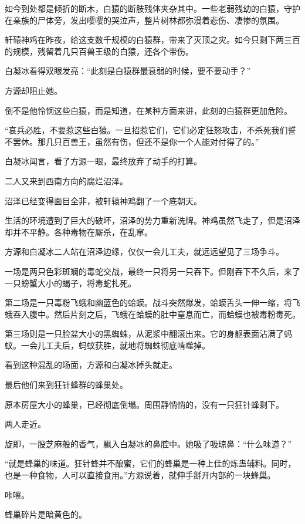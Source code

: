 \begin{this_body}
如今到处都是倾折的断木，白猿的断肢残体夹杂其中。一些老弱残幼的白猿，守护在亲族的尸体旁，发出嘤嘤的哭泣声，整片树林都弥漫着悲伤、凄惨的氛围。

轩辕神鸡在昨夜，给这支数千规模的白猿群，带来了灭顶之灾。如今只剩下两三百的规模，残留着几只百兽王级的白猿，还各个带伤。

白凝冰看得双眼发亮：“此刻是白猿群最衰弱的时候，要不要动手？”

方源却阻止她。

倒不是他怜悯这些白猿，而是知道，在某种方面来讲，此刻的白猿群更加危险。

“哀兵必胜，不要惹这些白猿。一旦招惹它们，它们必定狂怒攻击，不杀死我们誓不罢休。那几只百兽王，虽然有伤，但还不是你一个人能对付得了的。”

白凝冰闻言，看了方源一眼，最终放弃了动手的打算。

二人又来到西南方向的腐烂沼泽。

沼泽已经变得面目全非，被轩辕神鸡翻了一个底朝天。

生活的环境遭到了巨大的破坏，沼泽的势力重新洗牌。神鸡虽然飞走了，但是沼泽却并不平静。各种毒物在厮杀，在乱窜。

方源和白凝冰二人站在沼泽边缘，仅仅一会儿工夫，就远远望见了三场争斗。

一场是两只色彩斑斓的毒蛇交战，最终一只将另一只吞下。但刚吞下不久后，来了一只螃蟹大小的蝎子，将毒蛇扎死。

第二场是一只毒粉飞蛾和幽蓝色的蛤蟆。战斗突然爆发，蛤蟆舌头一伸一缩，将飞蛾吞入腹中。然后片刻之后，飞蛾在蛤蟆的肚中窒息而亡，而蛤蟆也被毒粉毒死。

第三场则是一只脸盆大小的黑蜘蛛，从泥浆中翻滚出来。它的身躯表面沾满了蚂蚁。一会儿工夫后，蚂蚁获胜，就地将蜘蛛彻底啃噬掉。

看到这种混乱的场面，方源和白凝冰掉头就走。

最后他们来到狂针蜂群的蜂巢处。

原本房屋大小的蜂巢，已经彻底倒塌。周围静悄悄的，没有一只狂针蜂剩下。

两人走近。

旋即，一股芝麻般的香气，飘入白凝冰的鼻腔中。她吸了吸琼鼻：“什么味道？”

“就是蜂巢的味道。狂针蜂并不酿蜜，它们的蜂巢是一种上佳的炼蛊辅料。同时，也是一种食物，人可以直接食用。”方源说着，就伸手掰开内部的一块蜂巢。

咔嚓。

蜂巢碎片是暗黄色的。


\end{this_body}

